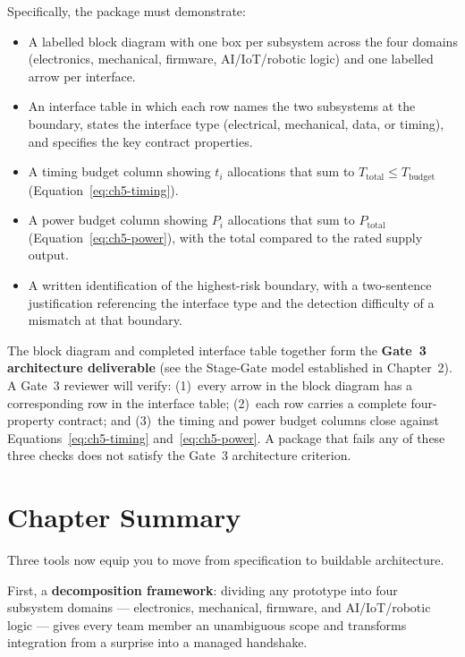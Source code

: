 \medskip
Specifically, the package must demonstrate:
\begin{itemize}
  \item A labelled block diagram with one box per subsystem across the four domains (electronics, mechanical, firmware, AI/IoT/robotic logic) and one labelled arrow per interface.
  \item An interface table in which each row names the two subsystems at the boundary, states the interface type (electrical, mechanical, data, or timing), and specifies the key contract properties.
  \item A timing budget column showing $t_i$ allocations that sum to $T_{\text{total}} \leq T_{\text{budget}}$ (Equation~\ref{eq:ch5-timing}).
  \item A power budget column showing $P_i$ allocations that sum to $P_{\text{total}}$ (Equation~\ref{eq:ch5-power}), with the total compared to the rated supply output.
  \item A written identification of the highest-risk boundary, with a two-sentence justification referencing the interface type and the detection difficulty of a mismatch at that boundary.
\end{itemize}

The block diagram and completed interface table together form the \textbf{Gate~3 architecture deliverable} (see the Stage-Gate model established in Chapter~2).
A Gate~3 reviewer will verify: (1)~every arrow in the block diagram has a corresponding row in the interface table; (2)~each row carries a complete four-property contract; and (3)~the timing and power budget columns close against Equations~\ref{eq:ch5-timing} and~\ref{eq:ch5-power}.
A package that fails any of these three checks does not satisfy the Gate~3 architecture criterion.

\section*{Chapter Summary}
\label{sec:ch5-summary}

Three tools now equip you to move from specification to buildable architecture.

First, a \textbf{decomposition framework}: dividing any prototype into four subsystem domains --- electronics, mechanical, firmware, and AI/IoT/robotic logic --- gives every team member an unambiguous scope and transforms integration from a surprise into a managed handshake.

